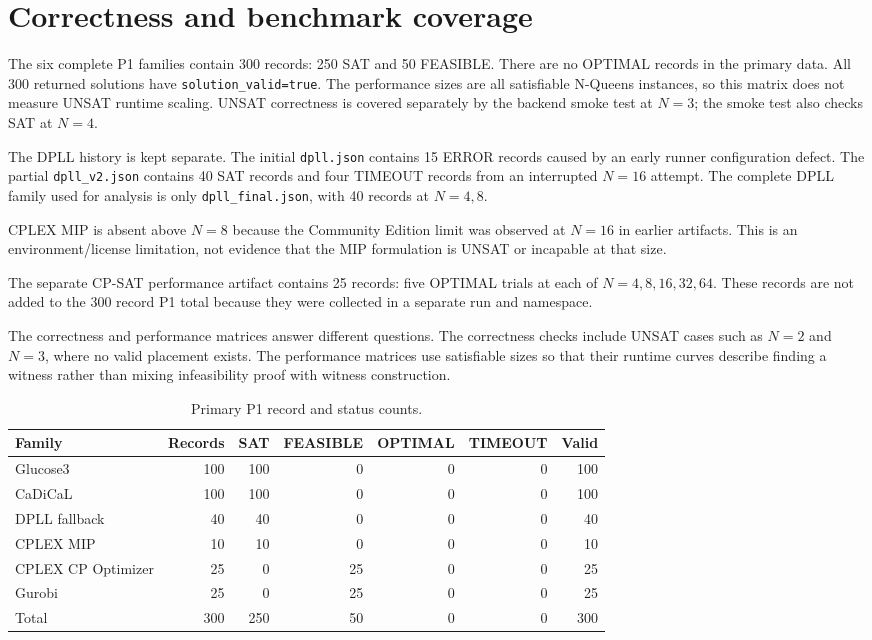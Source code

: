 \documentclass[a4paper,fleqn]{cas-sc}
\begin{document}
\section{Correctness and benchmark coverage}
The six complete P1 families contain 300 records: 250 SAT and 50 FEASIBLE.
There are no OPTIMAL records in the primary data. All 300 returned solutions
have \texttt{solution\_valid=true}. The performance sizes are all satisfiable
N-Queens instances, so this matrix does not measure UNSAT runtime scaling.
UNSAT correctness is covered separately by the backend smoke test at $N=3$;
the smoke test also checks SAT at $N=4$.

The DPLL history is kept separate. The initial \texttt{dpll.json} contains 15
ERROR records caused by an early runner configuration defect. The partial
\texttt{dpll\_v2.json} contains 40 SAT records and four TIMEOUT records from
an interrupted $N=16$ attempt. The complete DPLL family used for analysis is
only \texttt{dpll\_final.json}, with 40 records at $N=4,8$.

CPLEX MIP is absent above $N=8$ because the Community Edition limit was
observed at $N=16$ in earlier artifacts. This is an environment/license
limitation, not evidence that the MIP formulation is UNSAT or incapable at
that size.

The separate CP-SAT performance artifact contains 25 records: five OPTIMAL
trials at each of $N=4,8,16,32,64$. These records are not added to the 300
record P1 total because they were collected in a separate run and namespace.

The correctness and performance matrices answer different questions. The
correctness checks include UNSAT cases such as $N=2$ and $N=3$, where no valid
placement exists. The performance matrices use satisfiable sizes so that their
runtime curves describe finding a witness rather than mixing infeasibility
proof with witness construction.

\begin{table}[H]
\centering
\caption{Primary P1 record and status counts.}
\label{tab:coverage}
\begin{tabular}{lrrrrrr}
\toprule
Family & Records & SAT & FEASIBLE & OPTIMAL & TIMEOUT & Valid\\
\midrule
Glucose3 & 100 & 100 & 0 & 0 & 0 & 100\\
CaDiCaL & 100 & 100 & 0 & 0 & 0 & 100\\
DPLL fallback & 40 & 40 & 0 & 0 & 0 & 40\\
CPLEX MIP & 10 & 10 & 0 & 0 & 0 & 10\\
CPLEX CP Optimizer & 25 & 0 & 25 & 0 & 0 & 25\\
Gurobi & 25 & 0 & 25 & 0 & 0 & 25\\
\midrule
Total & 300 & 250 & 50 & 0 & 0 & 300\\
\bottomrule
\end{tabular}
\end{table}
\end{document}
